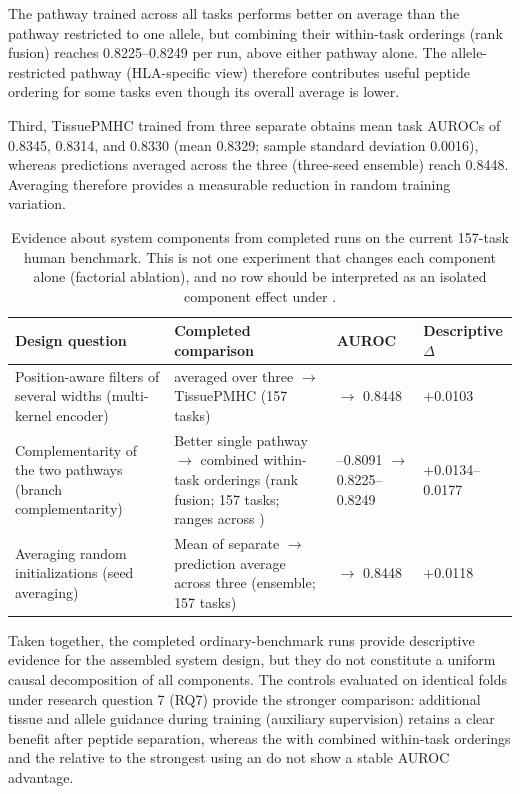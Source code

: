 The pathway trained across all tasks performs better on average than the pathway restricted to one \plainHLA{} allele, but combining their within-task orderings (rank fusion) reaches 0.8225--0.8249 per run, above either pathway alone. The allele-restricted pathway (HLA-specific view) therefore contributes useful peptide ordering for some tasks even though its overall average is lower.

Third, TissuePMHC trained from three separate \plainSeeds{} obtains mean task AUROCs of 0.8345, 0.8314, and 0.8330 (mean 0.8329; sample standard deviation 0.0016), whereas predictions averaged across the three \plainSeeds{} (three-seed ensemble) reach 0.8448. Averaging \plainSeeds{} therefore provides a measurable reduction in random training variation.

\begin{table}[tbp]
\centering
\caption{Evidence about system components from completed runs on the current 157-task human benchmark. This is not one experiment that changes each component alone (factorial ablation), and no row should be interpreted as an isolated component effect under \plainPeptideOOF{}.}
\label{tab:component-evidence}
\scriptsize
\setlength{\tabcolsep}{2pt}
\begin{tabular}{@{}>{\raggedright\arraybackslash}p{2.3cm}>{\raggedright\arraybackslash}p{4.0cm}>{\centering\arraybackslash}p{3.0cm}>{\centering\arraybackslash}p{1.4cm}@{}}
\toprule
Design question & Completed comparison & AUROC & Descriptive $\Delta$ \\ 
\midrule
Position-aware filters of several widths (multi-kernel encoder) & \plainMLP{} averaged over three \plainSeeds{} $\rightarrow$ TissuePMHC (157 tasks) & 0.8345 $\rightarrow$ 0.8448 & +0.0103 \\ 
Complementarity of the two pathways (branch complementarity) & Better single pathway $\rightarrow$ combined within-task orderings (rank fusion; 157 tasks; ranges across \plainSeeds{}) & 0.8072--0.8091 $\rightarrow$ 0.8225--0.8249 & +0.0134--0.0177 \\ 
Averaging random initializations (seed averaging) & Mean of separate \plainSeeds{} $\rightarrow$ prediction average across three \plainSeeds{} (ensemble; 157 tasks) & 0.8329 $\rightarrow$ 0.8448 & +0.0118 \\ 
\bottomrule
\end{tabular}
\end{table}

Taken together, the completed ordinary-benchmark runs provide descriptive evidence for the assembled system design, but they do not constitute a uniform causal decomposition of all components. The controls evaluated on identical \plainPeptideOOF{} folds under research question 7 (RQ7) provide the stronger comparison: additional tissue and allele guidance during training (auxiliary supervision) retains a clear benefit after peptide separation, whereas the \plainPlainDual{} with combined within-task orderings and the \plainMultiKernel{} relative to the strongest \plainAuxDual{} using an \plainMLP{} do not show a stable AUROC advantage.

